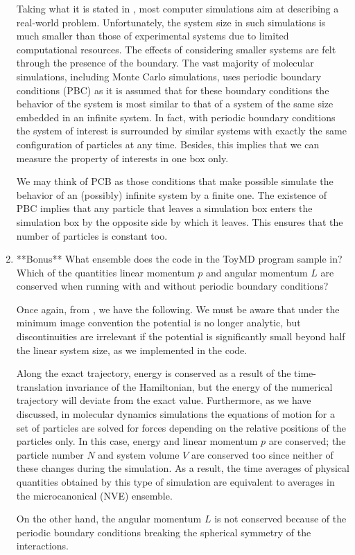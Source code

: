 \documentclass[12pt,letterpaper]{report}
\begin{document}
\begin{enumerate}
		Taking what it is stated in \cite{thijssen_2007}, most computer simulations aim at describing a real-world problem. Unfortunately, the system size in such simulations is much smaller than those of experimental systems due to limited computational resources. The effects of considering smaller systems are felt through the presence of the boundary.
		The vast majority of molecular simulations, including Monte Carlo simulations, uses	periodic boundary conditions (PBC) as it is assumed that for these boundary conditions the behavior of the system is most similar to that of a system of the same size embedded in an infinite system. In fact, with periodic boundary
		conditions the system of interest is surrounded by similar systems with exactly	the same configuration of particles at any time. Besides, this implies that we can measure the property of interests in one box only. 
		
		We may think of PCB as those conditions that make possible simulate the behavior of an (possibly) infinite system by a finite one. The existence of PBC implies that any particle that leaves a simulation box enters the simulation box by the opposite side by which it leaves. This ensures that the number of particles is constant too.
			
		\item		
		**Bonus** What ensemble does the code in the ToyMD program sample in? Which of the quantities linear momentum $p$ and angular momentum $L$ are conserved when running with and without periodic boundary conditions?
		
		Once again, from \cite{thijssen_2007}, we have the following. We must be aware that under the minimum image convention the potential is no longer analytic, but discontinuities are irrelevant if the potential is significantly small beyond half the linear system size, as we implemented in the code. 
		
		Along the exact trajectory, energy is conserved as a result of the time-translation invariance of the Hamiltonian, but the energy of the numerical trajectory	will deviate from the exact value. Furthermore, as we have discussed, in molecular dynamics simulations the equations of motion for a set of particles are solved for forces depending on the relative positions of the particles only. In this case, energy and linear momentum $p$ are conserved; the particle number $N$ and system volume $V$ are conserved too since neither of these changes during the simulation. As a result, the time averages of physical quantities obtained by this type of simulation are equivalent to averages in the microcanonical (NVE) ensemble.
			
		On the other hand, the angular momentum $L$ is not conserved because of the periodic boundary conditions breaking the	spherical symmetry of the interactions.

	\end{enumerate}

	\newpage
	\printbibliography
	
%
\end{document}
